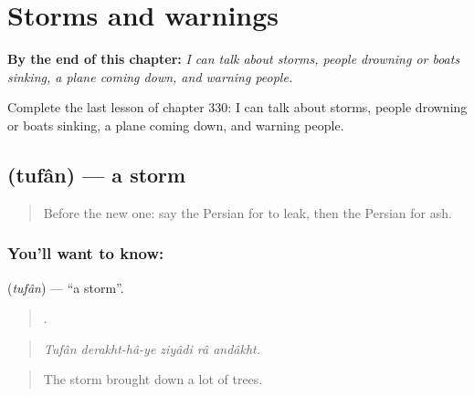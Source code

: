 
\chapter{Storms and warnings}
\label{ch:fa-storms-and-warnings}

\begin{chapteropening}
\textbf{By the end of this chapter:} \emph{I can talk about storms, people drowning or boats sinking, a plane coming down, and warning people.}

Complete the last lesson of chapter 330: I can talk about storms, people drowning or boats sinking, a plane coming down, and warning people.
\end{chapteropening}

\section[\texorpdfstring{\fa{طوفان} (tufân)}{طوفان (tufân)}]{ (tufân) — a storm}

\label{lesson:FA-C330-tufan}



\begin{quote}
Before the new one: say the Persian for to leak, then the Persian for ash.
\end{quote}

\subsection*{You'll want to know: }
\textbf{} (\emph{tufân}) — \textquotedblleft{}a storm\textquotedblright{}.

\begin{quote}
     .
\end{quote}

\begin{quote}
\emph{Tufân derakht-hâ-ye ziyâdi râ andâkht.}
\end{quote}

\begin{quote}
The storm brought down a lot of trees.
\end{quote}

